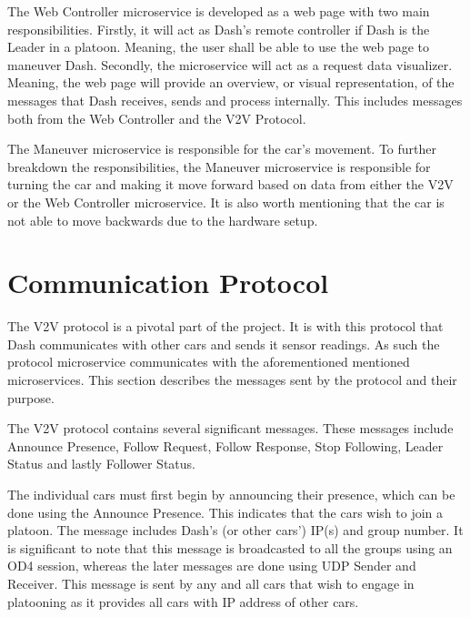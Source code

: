 \documentclass[12pt]{article}
\begin{document}
The Web Controller microservice is developed as a web page with two main responsibilities. Firstly, it will act as Dash’s remote controller if Dash is the Leader in a platoon. Meaning, the user shall be able to use the web page to maneuver Dash. Secondly, the microservice will act as a request data visualizer. Meaning, the web page will provide an overview, or visual representation, of the messages that Dash receives, sends and process internally. This includes messages both from the Web Controller and the V2V Protocol. \par  

The Maneuver microservice is responsible for the car’s movement. To further breakdown the responsibilities, the Maneuver microservice is responsible for turning the car and making it move forward based on data from either the V2V or the Web Controller microservice. It is also worth mentioning that the car is not able to move backwards due to the hardware setup.\par

\section{Communication Protocol}
The V2V protocol is a pivotal part of the project. It is with this protocol that Dash communicates with other cars and sends it sensor readings. As such the protocol microservice communicates with the aforementioned mentioned microservices. This section describes the messages sent by the protocol and their purpose. \par

The V2V protocol contains several significant messages. These messages include Announce Presence, Follow Request, Follow Response, Stop Following, Leader Status and lastly Follower Status. \par

The individual cars must first begin by announcing their presence, which can be done using the Announce Presence. This indicates that the cars wish to join a platoon. The message includes Dash’s (or other cars’) IP(s) and group number. It is significant to note that this message is broadcasted to all the groups using an OD4 session, whereas the later messages are done using UDP Sender and Receiver. This message is sent by any and all cars that wish to engage in platooning as it provides all cars with IP address of other cars. \par
\end{document}
